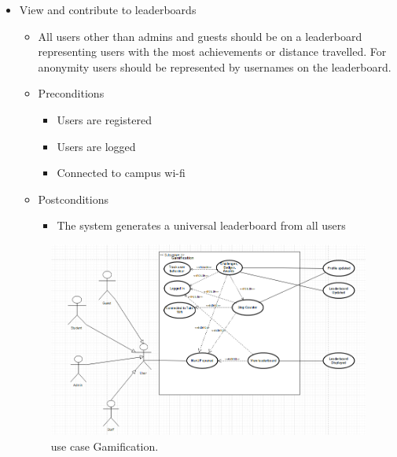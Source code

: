 \documentclass[12pt]{article}
\begin{document}
\begin{enumerate}
\begin{itemize}
				\item View and contribute to leaderboards
				\begin{itemize}
					\item All users other than admins and guests should be on a leaderboard representing users with the most achievements or distance travelled. For anonymity users should be represented by usernames on the leaderboard.
					\item Preconditions
					\begin{itemize}
						\item Users are registered
						\item Users are logged
						\item Connected to campus wi-fi
					\end{itemize}
					\item Postconditions
					\begin{itemize}
						\item The system generates a universal leaderboard from all users
					\end{itemize}
				\end{itemize}
				\begin{figure}
				    \includegraphics[width=\linewidth]{useCaseGamification.png}
				    \caption{use case Gamification.}
  \label{fig:gamification}
				\end{figure}
			\end{itemize}
			

\end{enumerate}
\end{document}
